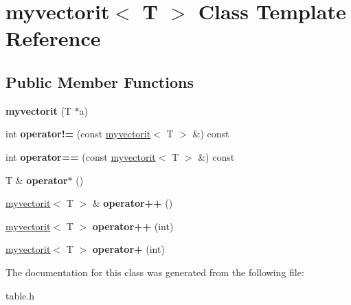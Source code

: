 \hypertarget{classmyvectorit}{}\section{myvectorit$<$ T $>$ Class Template Reference}
\label{classmyvectorit}
\subsection*{Public Member Functions}
\begin{DoxyCompactItemize}
\item 
\hypertarget{classmyvectorit_a792a1ad30e22fb8fc9133e9257c4793b}{}{\bfseries myvectorit} (T $\ast$a)\label{classmyvectorit_a792a1ad30e22fb8fc9133e9257c4793b}

\item 
\hypertarget{classmyvectorit_a72f5cd0e39dbe6fdf99e6ddae000d2db}{}int {\bfseries operator!=} (const \hyperlink{classmyvectorit}{myvectorit}$<$ T $>$ \&) const \label{classmyvectorit_a72f5cd0e39dbe6fdf99e6ddae000d2db}

\item 
\hypertarget{classmyvectorit_a3fb7bdf2e6e90500cba4191d138223e7}{}int {\bfseries operator==} (const \hyperlink{classmyvectorit}{myvectorit}$<$ T $>$ \&) const \label{classmyvectorit_a3fb7bdf2e6e90500cba4191d138223e7}

\item 
\hypertarget{classmyvectorit_ac92114d5ecc8647d1047342327da07ba}{}T \& {\bfseries operator$\ast$} ()\label{classmyvectorit_ac92114d5ecc8647d1047342327da07ba}

\item 
\hypertarget{classmyvectorit_a2709605817e965c90358a2e298fdeda5}{}\hyperlink{classmyvectorit}{myvectorit}$<$ T $>$ \& {\bfseries operator++} ()\label{classmyvectorit_a2709605817e965c90358a2e298fdeda5}

\item 
\hypertarget{classmyvectorit_aaf292a5d33dd4b2f5536dd9eac37defe}{}\hyperlink{classmyvectorit}{myvectorit}$<$ T $>$ {\bfseries operator++} (int)\label{classmyvectorit_aaf292a5d33dd4b2f5536dd9eac37defe}

\item 
\hypertarget{classmyvectorit_a6c87eadd18d9aa349c4a844b587fd6e2}{}\hyperlink{classmyvectorit}{myvectorit}$<$ T $>$ {\bfseries operator+} (int)\label{classmyvectorit_a6c87eadd18d9aa349c4a844b587fd6e2}

\end{DoxyCompactItemize}


The documentation for this class was generated from the following file\+:\begin{DoxyCompactItemize}
\item 
table.\+h\end{DoxyCompactItemize}
